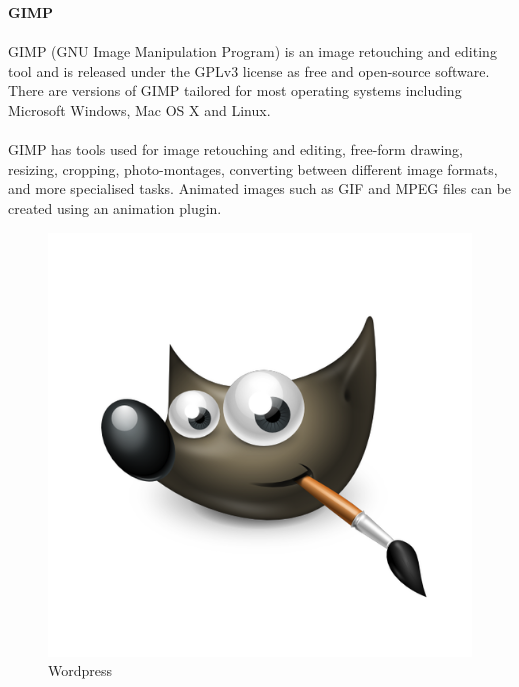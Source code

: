 {\bf GIMP}\\\\
GIMP (GNU Image Manipulation Program) is an image retouching and editing tool and is released under the GPLv3 license as free and open-source software. There are versions of GIMP tailored for most operating systems including Microsoft Windows, Mac OS X and Linux.\\\\
GIMP has tools used for image retouching and editing, free-form drawing, resizing, cropping, photo-montages, converting between different image formats, and more specialised tasks. Animated images such as GIF and MPEG files can be created using an animation plugin.
\begin{figure}[h]
\centering \includegraphics[scale=0.4]{gimp.png}
\caption{Wordpress}
\end{figure}
\newpage

